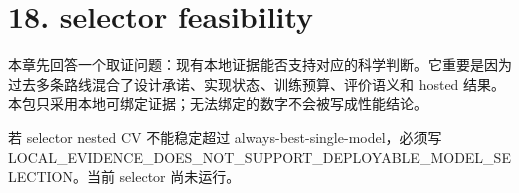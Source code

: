 \section{18. selector feasibility}

本章先回答一个取证问题：现有本地证据能否支持对应的科学判断。它重要是因为过去多条路线混合了设计承诺、实现状态、训练预算、评价语义和 hosted 结果。本包只采用本地可绑定证据；无法绑定的数字不会被写成性能结论。



若 selector nested CV 不能稳定超过 always-best-single-model，必须写 LOCAL_EVIDENCE_DOES_NOT_SUPPORT_DEPLOYABLE_MODEL_SELECTION。当前 selector 尚未运行。



\clearpage